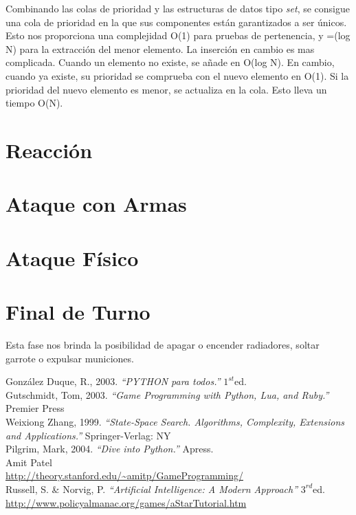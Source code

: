 \documentclass[a4paper,12pt,oneside]{book}
\begin{document}
Combinando las colas de prioridad y las estructuras de datos tipo {\it
  set}, se consigue una cola de prioridad en la que sus componentes
están garantizados a ser únicos. \\

Esto nos proporciona una complejidad O(1) para pruebas de pertenencia,
y =(log N) para la extracción del menor elemento. La inserción en
cambio es mas complicada. Cuando un elemento no existe, se añade en
O(log N). En cambio, cuando ya existe, su prioridad se comprueba con
el nuevo elemento en O(1). Si la prioridad del nuevo elemento es
menor, se actualiza en la cola. Esto lleva un tiempo O(N).

\section{Reacción}
\section{Ataque con Armas}
\section{Ataque Físico}
\section{Final de Turno}

Esta fase nos brinda la posibilidad de apagar o encender radiadores,
soltar garrote o expulsar municiones.

\newpage
\begin{thebibliography}{XXX}
 González Duque, R., 2003. {\it ``PYTHON para todos.''} $1^{st}$ed. \\
 Gutschmidt, Tom, 2003. {\it ``Game Programming with Python,
    Lua, and Ruby.''  } Premier Press \\
 Weixiong Zhang, 1999. {\it ``State-Space Search. Algorithms,
  Complexity, Extensions and Applications.''} Springer-Verlag: NY \\
 Pilgrim, Mark, 2004. {\it ``Dive into Python.''} Apress. \\
 Amit Patel\\ \url{
    http://theory.stanford.edu/~amitp/GameProgramming/} \label{amit}
  \\
 Russell, S. \& Norvig, P. {\it ``Artificial Intelligence: A
    Modern Approach''} $3^{rd}$ed. \\ \label{russell}
  \url{http://www.policyalmanac.org/games/aStarTutorial.htm}\\
  \url{ }\\
  \url{ }\\
  \url{ }
\end{thebibliography}
\end{document}
